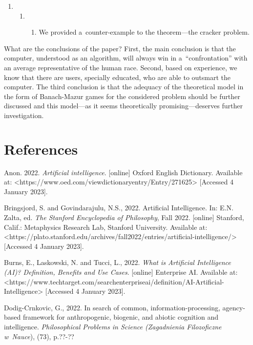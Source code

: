 {\begin{enumerate}
\item \begin{enumerate}
\item \begin{enumerate}
\item We provided a~counter-example to the theorem—the cracker problem.
\end{enumerate}
\end{enumerate}
\end{enumerate}
What are the conclusions of the paper? First, the main conclusion is that the computer, understood as an algorithm, will always win in a~``confrontation'' with an average representative of the human race. Second, based on experience, we know that there are users, specially educated, who are able to outsmart the computer. The third conclusion is that the adequacy of the theoretical model in the form of Banach-Mazur games for the considered problem should be further discussed and this model—as it seems theoretically promising—deserves further investigation.

\section{References}
Anon. 2022. \textit{Artificial intelligence}. [online] Oxford English Dictionary. Available at: {\textless}https://www.oed.com/viewdictionaryentry/Entry/271625{\textgreater} [Accessed 4 January 2023].

Bringsjord, S. and Govindarajulu, N.S., 2022. Artificial Intelligence. In: E.N. Zalta, ed. \textit{The Stanford Encyclopedia of Philosophy}, Fall 2022. [online] Stanford, Calif.: Metaphysics Research Lab, Stanford University. Available at: {\textless}https://plato.stanford.edu/archives/fall2022/entries/artificial-intelligence/{\textgreater} [Accessed 4 January 2023].

Burns, E., Laskowski, N. and Tucci, L., 2022. \textit{What is Artificial Intelligence (AI)? Definition, Benefits and Use Cases}. [online] Enterprise AI. Available at: {\textless}https://www.techtarget.com/searchenterpriseai/definition/AI-Artificial-Intelligence{\textgreater} [Accessed 4 January 2023].

Dodig-Crnkovic, G., 2022. In search of common, information-processing, agency-based framework for anthropogenic, biogenic, and abiotic cognition and intelligence. \textit{Philosophical Problems in Science (Zagadnienia Filozoficzne w~Nauce}), (73), p.??-??

}
